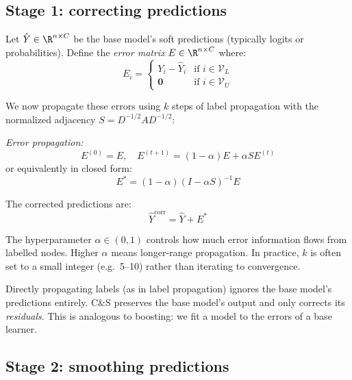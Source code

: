 \begin{notechapter}
\subsection{Stage 1: correcting predictions}

Let $\hat{Y} \in \R^{n \times C}$ be the base model's soft predictions
(typically logits or probabilities). Define the \emph{error matrix}
$E \in \R^{n \times C}$ where:
\begin{equation}
E_{i} = \begin{cases}
Y_i - \hat{Y}_i & \text{if } i \in \mathcal{V}_L \\
\mathbf{0} & \text{if } i \in \mathcal{V}_U
\end{cases}
\end{equation}

We now propagate these errors using $k$ steps of label propagation with the
normalized adjacency $S = D^{-1/2}AD^{-1/2}$:

\begin{keyidea}
\emph{Error propagation:}
\begin{equation}
E^{(0)} = E, \quad E^{(t+1)} = (1-\alpha) E + \alpha S E^{(t)}
\end{equation}
or equivalently in closed form:
\begin{equation}
E^* = (1-\alpha)(I - \alpha S)^{-1} E
\end{equation}

The corrected predictions are:
\begin{equation}
\hat{Y}^{\text{corr}} = \hat{Y} + E^*
\end{equation}
\end{keyidea}

The hyperparameter $\alpha \in (0,1)$ controls how much error information flows
from labelled nodes. Higher $\alpha$ means longer-range propagation. In practice,
$k$ is often set to a small integer (e.g.\ 5--10) rather than iterating to
convergence.

\begin{remark}
Directly propagating labels (as in label propagation) ignores the base model's
predictions entirely. C\&S preserves the base model's output and only corrects
its \emph{residuals}. This is analogous to boosting: we fit a model to the
errors of a base learner.
\end{remark}

\subsection{Stage 2: smoothing predictions}


\end{notechapter}
